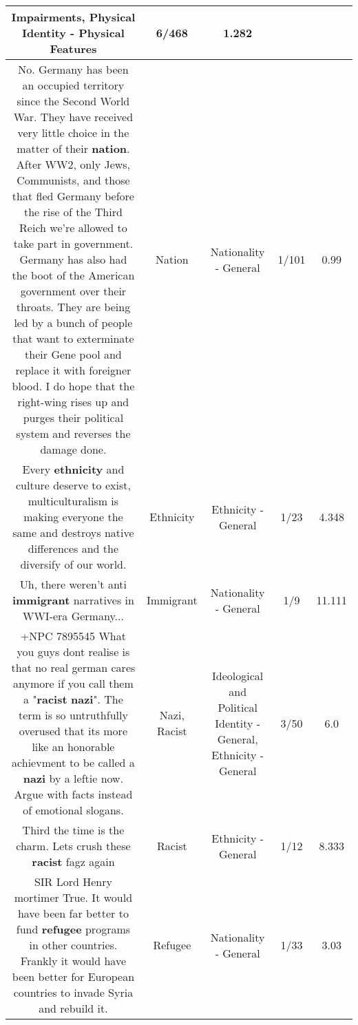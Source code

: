 \documentclass[11pt]{article}
\newlength\mylength
\begin{document}
\begin{center}
\begin{longtable}{|C{.65\mylength}|C{.30\mylength}|C{.12\mylength}|C{.12\mylength}|C{.12\mylength}|}
Impairments, Physical Identity - Physical Features & 6/468 & 1.282 \\  \hline
  \small No. Germany has been an occupied territory since the Second World War. They have received very little choice in the matter of their \textbf{nation}. After WW2, only Jews, Communists, and those that fled Germany before the rise of the Third Reich we're allowed to take part in government. Germany has also had the boot of the American government over their throats. They are being led by a bunch of people that want to exterminate their Gene pool and replace it with foreigner blood. I do hope that the right-wing rises up and purges their political system and reverses the damage done.\normalsize   & Nation & Nationality - General & 1/101 & 0.99 \\  \hline
  \small Every \textbf{ethnicity} and culture deserve to exist, multiculturalism is making everyone the same and destroys native differences and the diversify of our world.\normalsize   & Ethnicity & Ethnicity - General & 1/23 & 4.348 \\  \hline
  \small Uh, there weren't anti \textbf{immigrant} narratives in WWI-era Germany...\normalsize   & Immigrant & Nationality - General & 1/9 & 11.111 \\  \hline
  \small +NPC 7895545 What you guys dont realise is that no real german cares anymore if you call them a "\textbf{racist} \textbf{nazi}". The term is so untruthfully overused that its more like an honorable achievment to be called a \textbf{nazi} by a leftie now. Argue with facts instead of emotional slogans.\normalsize   & Nazi, Racist &  Ideological and Political Identity - General, Ethnicity - General & 3/50 & 6.0 \\  \hline
  \small Third the time is the charm. Lets crush these \textbf{racist} fagz again\normalsize   & Racist & Ethnicity - General & 1/12 & 8.333 \\  \hline
  \small SIR Lord Henry mortimer True. It would have been far better to fund \textbf{refugee} programs in other countries. Frankly it would have been better for European countries to invade Syria and rebuild it.\normalsize   & Refugee & Nationality - General & 1/33 & 3.03 \\  \hline

\end{longtable}
\end{center}
\end{document}
